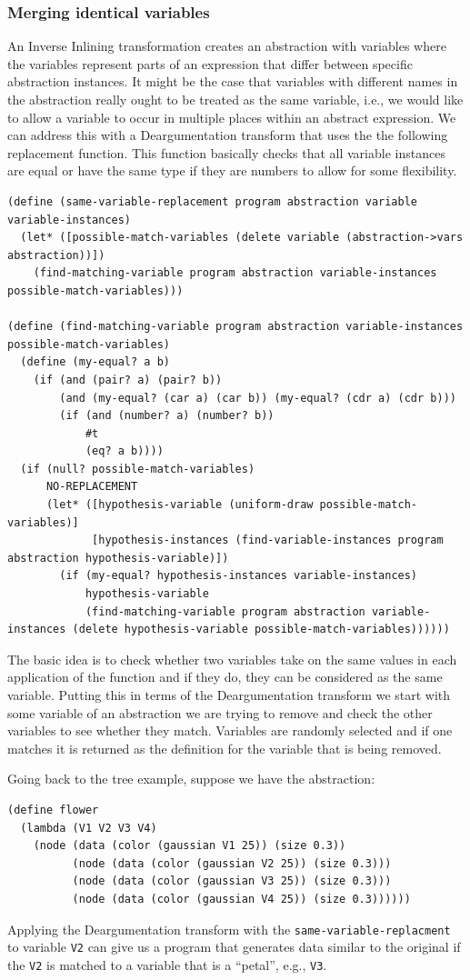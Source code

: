 \documentclass[a4paper,10pt]{article}
\begin{document}
\subsubsection{Merging identical variables}
An Inverse Inlining transformation creates an abstraction with variables where the variables represent parts of an expression that differ between specific abstraction instances.  It might be the case that variables with different names in the abstraction really ought to be treated as the same variable, i.e., we would like to allow a variable to occur in multiple places within an abstract expression.  We can address this with a Deargumentation transform that uses the the following replacement function.  This function basically checks that all variable instances are equal or have the same type if they are numbers to allow for some flexibility.
\begin{lstlisting}[frame=trBL]
(define (same-variable-replacement program abstraction variable variable-instances)
  (let* ([possible-match-variables (delete variable (abstraction->vars abstraction))])
    (find-matching-variable program abstraction variable-instances possible-match-variables)))

(define (find-matching-variable program abstraction variable-instances possible-match-variables)
  (define (my-equal? a b) 
    (if (and (pair? a) (pair? b)) 
        (and (my-equal? (car a) (car b)) (my-equal? (cdr a) (cdr b))) 
        (if (and (number? a) (number? b))
            #t
            (eq? a b)))) 
  (if (null? possible-match-variables)
      NO-REPLACEMENT
      (let* ([hypothesis-variable (uniform-draw possible-match-variables)]
             [hypothesis-instances (find-variable-instances program abstraction hypothesis-variable)])
        (if (my-equal? hypothesis-instances variable-instances)
            hypothesis-variable
            (find-matching-variable program abstraction variable-instances (delete hypothesis-variable possible-match-variables))))))
\end{lstlisting}
The basic idea is to check whether two variables take on the same values in each application of the function and if they do, they can be considered as the same variable.  Putting this in terms of the Deargumentation transform we start with some variable of an abstraction we are trying to remove and check the other variables to see whether they match.  Variables are randomly selected and if one matches it is returned as the definition for the variable that is being removed.  

Going back to the tree example, suppose we have the abstraction:
\begin{lstlisting}
(define flower
  (lambda (V1 V2 V3 V4)
    (node (data (color (gaussian V1 25)) (size 0.3))
          (node (data (color (gaussian V2 25)) (size 0.3)))
          (node (data (color (gaussian V3 25)) (size 0.3)))
          (node (data (color (gaussian V4 25)) (size 0.3))))))
\end{lstlisting}
Applying the Deargumentation transform with the \texttt{same-variable-replacment} to variable \texttt{V2} can give us a program that generates data similar to the original if the \texttt{V2} is matched to a variable that is a ``petal'', e.g., \texttt{V3}.
\end{document}
